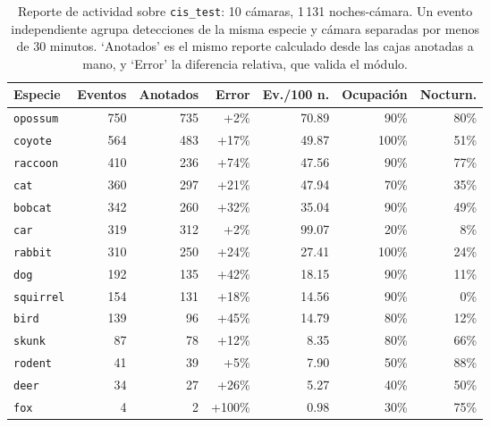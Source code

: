 \begin{table}[t]
  \centering
  \footnotesize
  \begin{tabular}{lrrrrrr}
    \toprule
    Especie & Eventos & Anotados & Error & Ev./100 n. & Ocupación & Nocturn. \\
    \midrule
    \texttt{opossum} & 750 & 735 & +2\% & 70.89 & 90\% & 80\% \\
    \texttt{coyote} & 564 & 483 & +17\% & 49.87 & 100\% & 51\% \\
    \texttt{raccoon} & 410 & 236 & +74\% & 47.56 & 90\% & 77\% \\
    \texttt{cat} & 360 & 297 & +21\% & 47.94 & 70\% & 35\% \\
    \texttt{bobcat} & 342 & 260 & +32\% & 35.04 & 90\% & 49\% \\
    \texttt{car} & 319 & 312 & +2\% & 99.07 & 20\% & 8\% \\
    \texttt{rabbit} & 310 & 250 & +24\% & 27.41 & 100\% & 24\% \\
    \texttt{dog} & 192 & 135 & +42\% & 18.15 & 90\% & 11\% \\
    \texttt{squirrel} & 154 & 131 & +18\% & 14.56 & 90\% & 0\% \\
    \texttt{bird} & 139 & 96 & +45\% & 14.79 & 80\% & 12\% \\
    \texttt{skunk} & 87 & 78 & +12\% & 8.35 & 80\% & 66\% \\
    \texttt{rodent} & 41 & 39 & +5\% & 7.90 & 50\% & 88\% \\
    \texttt{deer} & 34 & 27 & +26\% & 5.27 & 40\% & 50\% \\
    \texttt{fox} & 4 & 2 & +100\% & 0.98 & 30\% & 75\% \\
    \bottomrule
  \end{tabular}
  \caption{Reporte de actividad sobre \texttt{cis\_test}: 10 cámaras, 1\,131 noches-cámara. Un evento independiente agrupa detecciones de la misma especie y cámara separadas por menos de 30 minutos. `Anotados' es el mismo reporte calculado desde las cajas anotadas a mano, y `Error' la diferencia relativa, que valida el módulo.}
  \label{tab:actividad_cis}
\end{table}
